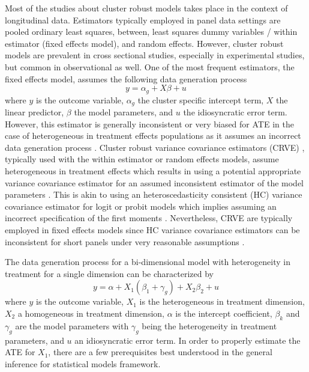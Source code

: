 \documentclass{jbsc}
\begin{document}
Most of the studies about cluster robust models takes place in the context of longitudinal data. Estimators typically employed in panel data settings are pooled ordinary least squares, between, least squares dummy variables / within estimator (fixed effects model), and random effects. However, cluster robust models are prevalent in cross sectional studies, especially in experimental studies, but common in observational as well. One of the most frequent estimators, the fixed effects model, assumes the following data generation process
\begin{equation}
y = \alpha_{g} + X \beta + u
\end{equation}
where $y$ is the outcome variable, $\alpha_{g}$ the cluster specific intercept term, $X$ the linear predictor, $\beta$ the model parameters, and $u$ the idiosyncratic error term. However, this estimator is generally inconsistent or very biased for ATE in the case of heterogeneous in treatment effects populations as it assumes an incorrect data generation process \citep{Gibbons_SúarezSerrato_Urbancic_2018}. Cluster robust variance covariance estimators (CRVE) \citep{Liang_Zeger_1986, Arellano_1987, Rogers_1993, Cameron_Gelbach_Miller_2011}, typically used with the within estimator or random effects models,  assume heterogeneous in treatment effects which results in using a potential appropriate variance covariance estimator for an assumed inconsistent estimator of the model parameters \citep{Abadie_Athey_Imbens_Wooldridge_2017}. This is akin to using an heteroscedasticity consistent (HC) variance covariance estimator \citep{Eicker_1967, Huber_1967, White_1980, MacKinnon_White_1985} for logit or probit models which implies assuming an incorrect specification of the first moments \citep{Wooldridge_2010}. Nevertheless, CRVE are typically employed in fixed effects models since HC variance covariance estimators can be inconsistent for short panels under very reasonable assumptions \citep{Stock_Watson_2008}.

The data generation process for a bi-dimensional model with heterogeneity in treatment for a single dimension can be characterized by
\begin{equation}
y = \alpha + X_{1} \left(\beta_{1} + \gamma_{g}\right) + X_{2} \beta_{2} + u
\end{equation}
where $y$ is the outcome variable, $X_{1}$ is the heterogeneous in treatment dimension, $X_{2}$ a homogeneous in treatment dimension, $\alpha$ is the intercept coefficient, $\beta_{k}$  and $\gamma_{g}$ are the model parameters with $\gamma_{g}$ being the heterogeneity in treatment parameters, and $u$ an idiosyncratic error term. In order to properly estimate the ATE for $X_{1}$, there are a few prerequisites best understood in the general inference for statistical models framework.
\end{document}

